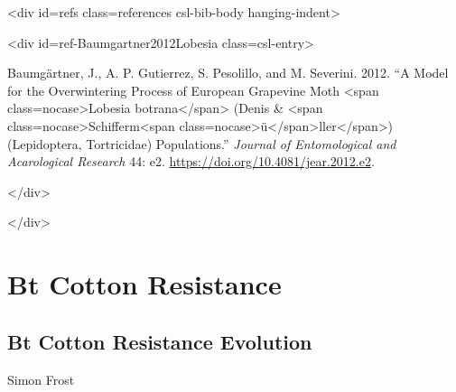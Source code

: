 <div id={\textquotedbl}refs{\textquotedbl} class={\textquotedbl}references csl-bib-body hanging-indent{\textquotedbl}>



<div id={\textquotedbl}ref-Baumgartner2012Lobesia{\textquotedbl} class={\textquotedbl}csl-entry{\textquotedbl}>



Baumgärtner, J., A. P. Gutierrez, S. Pesolillo, and M. Severini. 2012. “A Model for the Overwintering Process of European Grapevine Moth <span class={\textquotedbl}nocase{\textquotedbl}>Lobesia botrana</span> (Denis \& <span class={\textquotedbl}nocase{\textquotedbl}>Schifferm<span class={\textquotedbl}nocase{\textquotedbl}>ü</span>ller</span>) (Lepidoptera, Tortricidae) Populations.” \emph{Journal of Entomological and Acarological Research} 44: e2. \href{https://doi.org/10.4081/jear.2012.e2}{https://doi.org/10.4081/jear.2012.e2}.



</div>



</div>



\chapter{Bt Cotton Resistance}


\section{Bt Cotton Resistance Evolution}



\label{8812451384493326141}{}


Simon Frost



